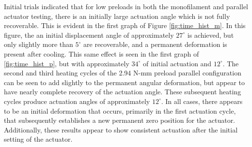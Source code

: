 \documentclass[twocolumn,10pt]{asme2e}
\begin{document}
Initial trials indicated that for low preloads in both the monofilament and parallel actuator testing, there is an initially large actuation angle which is not fully recoverable. This is evident in the first graph of Figure \ref{fig:time_hist_m}. In this figure, the an initial displacement angle of approximately $27^\circ$ is achieved, but only slightly more than $5^\circ$ are recoverable, and a permanent deformation is present after cooling. This same effect is seen in the  first graph of \ref{fig:time_hist_p}, but with approximately $34^\circ$ of initial actuation and $12^\circ$. The second and third heating cycles of the 2.94 N-mm preload parallel configuration can be seen to add slightly to the permanent angular deformation, but appear to have nearly complete recovery of the actuation angle. These subsequent heating cycles produce actuation angles of approximately $12^\circ$. In all cases, there appears to be an initial deformation that occurs, primarily in the first actuation cycle, that subsequently establishes a new permanent zero position for the actuator. Additionally, these results appear to show consistent actuation after the initial setting of the actuator. 
\end{document}
